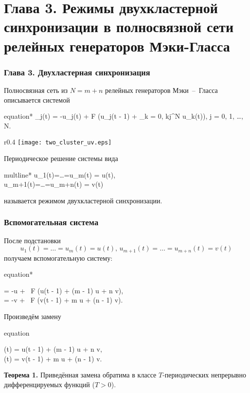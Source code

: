 \section{Глава 3. Режимы двухкластерной синхронизации в полносвязной сети релейных генераторов Мэки-Гласса}

\begin{frame}
	\frametitle{Глава 3. Двухластерная синхронизация}
	
	Полносвязная сеть из $N = m + n$ релейных генераторов Мэки~--~Гласса описывается системой	
	\begin{empheq}[box=\myeq]{equation*}
		_j(t) = -\beta u_j(t) + \alpha F \bigg(u_j(t - 1) + \delta\sum\limits_{k = 0, k\neq j}^N u_k(t)\bigg), \quad j = 0, 1, \dots, N.
	\end{empheq}
	
	\begin{wrapfigure}{r}{0.4\textwidth} 
		\vspace{-23pt} 
		\centering
		\texttt{[image: two\_cluster\_uv.eps]}
	\end{wrapfigure}
	
	Периодическое решение системы вида
	\begin{empheq}[box=\myeq]{multline*}
		u_1(t)=\ldots=u_m(t) = u(t),\\u_{m+1}(t)=\ldots=u_{m+n}(t) = v(t)
	\end{empheq}
	называется режимом двухкластерной синхронизации.
	
\end{frame}

\begin{frame}
	\frametitle{Вспомогательная система}
	\small
	После подстановки 
	$$u_1(t)=\ldots=u_m(t) = u(t), \, u_{m+1}(t)=\ldots=u_{m+n}(t) = v(t)$$
	получаем вспомогательную систему:
	\begin{empheq}[box=\myeq]{equation*}
		\label{eq:pres:aux}
		\begin{cases}
			 = -\beta u + \alpha \, F \big(u(t - 1) + \delta (m - 1) u + \delta n v\big),\\
			 = -\beta v + \alpha \, F \big(v(t - 1) + \delta m u + \delta (n - 1) v\big).
		\end{cases}\tag{AUX2}
	\end{empheq}
	
	Произведём замену 
	\begin{empheq}[box=\myeq]{equation}
	\label{eq:pres:tilde_change}
		\begin{cases}
			(t) = u(t - 1) + \delta (m - 1) u + \delta n v,\\ (t) = v(t - 1) + \delta m u + \delta (n - 1) v.
		\end{cases}
	\end{empheq}
	
	\textbf{Теорема 1.} Приведённая замена обратима в классе $T$-периодических непрерывно дифференцируемых функций ($T > 0$).
	\normalsize
	
\end{frame}

